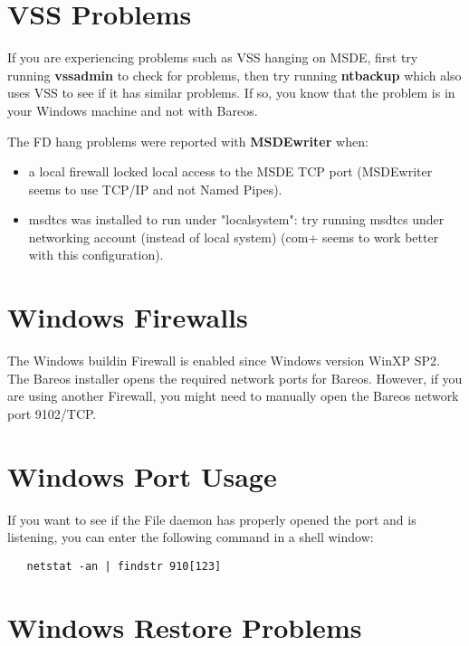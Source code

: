 \section{VSS Problems}


If you are experiencing problems such as VSS hanging on MSDE, first try
running {\bf vssadmin} to check for problems, then try running {\bf
ntbackup} which also uses VSS to see if it has similar problems. If so, you
know that the problem is in your Windows machine and not with Bareos.

The FD hang problems were reported with {\bf MSDEwriter} when:
\begin{itemize}
\item a local firewall locked local access to the MSDE TCP port (MSDEwriter
seems to use TCP/IP and not Named Pipes).
\item msdtcs was installed to run under "localsystem": try running msdtcs
under  networking account (instead of local system) (com+ seems to work
better with this configuration).
\end{itemize}


\section{Windows Firewalls}

The Windows buildin Firewall is enabled since Windows version WinXP SP2.
The Bareos installer opens the required network ports for Bareos.
However, if you are using another Firewall, you might need to manually open the Bareos network port 9102/TCP.

\section{Windows Port Usage}

If you want to see if the File daemon has properly opened the port and is
listening, you can enter the following command in a shell window:

\footnotesize
\begin{verbatim}
   netstat -an | findstr 910[123]
\end{verbatim}
\normalsize


\section{Windows Restore Problems}

